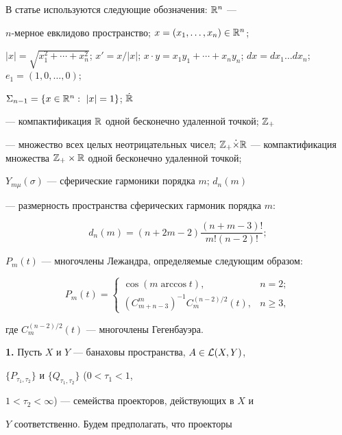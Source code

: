 В статье используются следующие обозначения: $\Bbb R^n$ ---


$n$-мерное евклидово пространство; $x=(x_1,\dotsc,x_n)\in\Bbb R^n$;


$|x|=\sqrt{x_1^2+\dotsb+x_n^2}$; $x'=x/|x|$; $x\cdot


y=x_1y_1+\dotsb+x_n y_n$; $dx=dx_1\dotsc dx_n$; $e_1=(1,0,\dotsc,0)$;


$\Sigma_{n-1}=\{x\in {\Bbb R}^n:\ |x|=1\}$; $\Dot{\Bbb R}$


--- компактификация $\Bbb R$ одной бесконечно удаленной точкой; $\Bbb Z_+$


--- множество всех целых неотрицательных чисел; $\Bbb


Z_+\Dot\times\Bbb R$ --- компактификация множества $\Bbb


Z_+\times\Bbb R$ одной бесконечно удаленной точкой;


$Y_{m\mu}(\sigma)$ --- сферические гармоники порядка $m$; $d_n(m)$


--- размерность пространства сферических гармоник порядка $m$:


$$


d_n(m)=(n+2m-2) \frac{(n+m-3)!}{m!(n-2)!};


$$


$P_m(t)$ --- многочлены Лежандра, определяемые следующим образом:


$$


P_m(t)=


\begin{cases}


\cos(m\arccos t), & n=2;\\


(C_{m+n-3}^m)^{-1} C_m^{(n-2)/2}(t), & n\geqslant 3,


\end{cases}


$$


где $C_m^{(n-2)/2}(t)$ --- многочлены Гегенбауэра.


\medskip





{\bf 1.} Пусть $X$ и $Y$ --- банаховы пространства, $A\in {\cal L}(X,Y)$,


$\{P_{\tau_1,\tau_2}\}$ и $\{Q_{\tau_1,\tau_2}\}$ ($0<\tau_1<1$,


$1<\tau_2<\infty$) --- семейства проекторов, действующих в $X$ и


$Y$ соответственно. Будем предполагать, что проекторы


